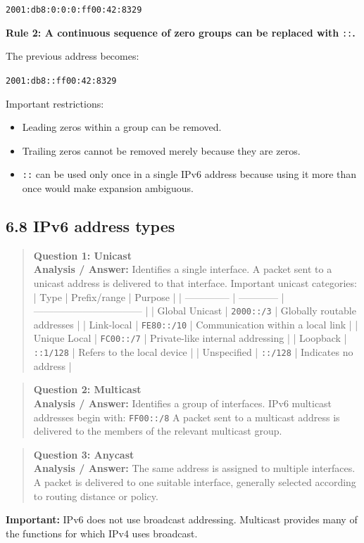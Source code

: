 \texttt{2001:db8:0:0:0:ff00:42:8329}

\textbf{Rule 2: A continuous sequence of zero groups can be replaced with }\texttt{::}\textbf{.}

The previous address becomes:

\texttt{2001:db8::ff00:42:8329}

Important restrictions:

\begin{itemize}
    \item Leading zeros within a group can be removed.
    \item Trailing zeros cannot be removed merely because they are zeros.
    \item \texttt{::} can be used only once in a single IPv6 address because using it more than once would make expansion ambiguous.
\end{itemize}

\subsection{6.8 IPv6 address types}

\begin{quote}
\textbf{Question 1: Unicast}\\[4pt]
\vspace{4pt}
\textbf{Analysis / Answer:} Identifies a single interface. A packet sent to a unicast address is delivered to that interface. Important unicast categories: | Type           | Prefix/range | Purpose                           | | -------------- | ------------ | --------------------------------- | | Global Unicast | \texttt{2000::/3}   | Globally routable addresses       | | Link-local     | \texttt{FE80::/10}  | Communication within a local link | | Unique Local   | \texttt{FC00::/7}   | Private-like internal addressing  | | Loopback       | \texttt{::1/128}    | Refers to the local device        | | Unspecified    | \texttt{::/128}     | Indicates no address              |
\end{quote}
\begin{quote}
\textbf{Question 2: Multicast}\\[4pt]
\vspace{4pt}
\textbf{Analysis / Answer:} Identifies a group of interfaces. IPv6 multicast addresses begin with: \texttt{FF00::/8} A packet sent to a multicast address is delivered to the members of the relevant multicast group.
\end{quote}
\begin{quote}
\textbf{Question 3: Anycast}\\[4pt]
\vspace{4pt}
\textbf{Analysis / Answer:} The same address is assigned to multiple interfaces. A packet is delivered to one suitable interface, generally selected according to routing distance or policy.
\end{quote}
\textbf{Important:} IPv6 does not use broadcast addressing. Multicast provides many of the functions for which IPv4 uses broadcast.

